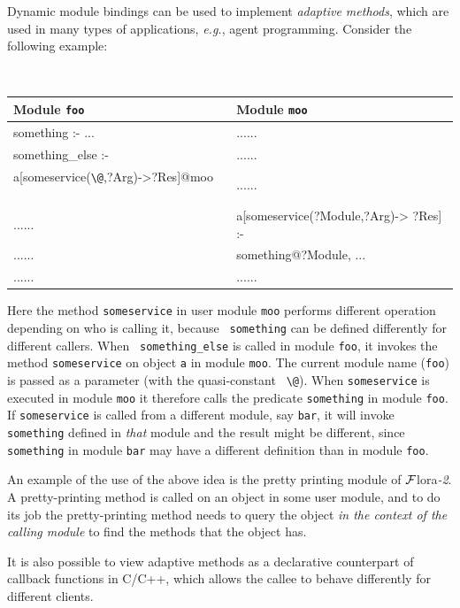 \documentclass[11pt]{article}
\makeatletter
\newcommand{\FLORA}{{\mbox{\sc ${\cal F}${lora}\rm\emph{-2}}}\xspace}
\newcommand{\FLSYSTEM}{\FLORA}
\newcommand{\thismodule}{{\tt \bs{}@}\xspace}
\newcommand{\bs}{\textbackslash}
\makeatother
\begin{document}
Dynamic module bindings can be used to implement \emph{adaptive methods},
which are used in  many types of applications, {\it e.g.}, agent
programming. Consider the following example:
  \begin{center}
    {\tt
    \begin{tabular}{l l}
      Module {\tt foo}  & Module {\tt moo} \\
      \hline
      something :- ... & ......\\
      something\_else :- & ......\\
      \hspace*{1.5cm}a[someservice(\thismodule,?Arg)->?Res]@moo ~~& ......\\
      ...... & a[someservice(?Module,?Arg)-> ?Res] :- \\
      ...... & \hspace*{2.2cm} something@?Module, ...\\
      ...... & ......
      
    \end{tabular}
    }
  \end{center}
  
  Here the method {\tt someservice} in user module {\tt moo} performs
  different operation depending on who is calling it, because {\tt
    something} can be defined differently for different callers.  When {\tt
    something\_else} is called in module {\tt foo}, it invokes the method
  {\tt someservice} on object {\tt a} in module {\tt moo}. The current
  module name ({\tt foo}) is passed as a parameter (with the quasi-constant {\tt
  \bs{}@}). When {\tt someservice}
  is executed in module {\tt moo} it therefore calls the predicate {\tt something} in
  module {\tt foo}.
  If {\tt someservice} is called from a different module, say {\tt bar},  it will invoke
  {\tt something} defined in \emph{that} module and the result might be
  different, since {\tt something} in module {\tt bar} may have a different
  definition than in module {\tt foo}.      
  
  An example of the use of the above idea is the pretty printing module of
  \FLSYSTEM.
  A pretty-printing method is called on an object in some
  user module, and to do its job the pretty-printing method needs to query
  the object \emph{in the context of the calling module} to find the
  methods that the object has.

It is also possible to view adaptive methods as a declarative counterpart
of callback functions in C/C++, which allows the callee to behave
differently for different clients.
\end{document}
